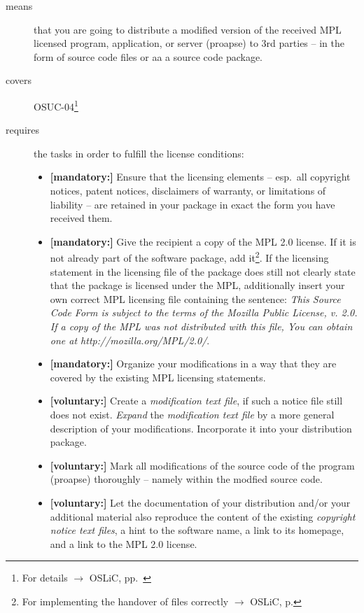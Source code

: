 \begin{description}
\item[means] that you are going to distribute a modified version of the received
MPL licensed program, application, or server (proapse) to 3rd parties -- in the
form of source code files or aa a source code package.
\item[covers] OSUC-04\footnote{For details $\rightarrow$ OSLiC, pp.\ \pageref{OSUC-04-DEF}}
\item[requires] the tasks in order to fulfill the license conditions:
\begin{itemize}
  
  \item \textbf{[mandatory:]} Ensure that the licensing elements -- esp.\ all
  copyright notices, patent notices, disclaimers of warranty, or limitations of
  liability -- are retained in your package in exact the form you have received
  them.

  \item \textbf{[mandatory:]} Give the recipient a copy of the MPL 2.0 license.
  If it is not already part of the software package, add it\footnote{For
  implementing the handover of files correctly $\rightarrow$ OSLiC, p.
  \pageref{DistributingFilesHint}}. If the licensing statement in the licensing
  file of the package does still not clearly state that the package is licensed
  under the MPL, additionally insert your own correct MPL licensing file
  containing the sentence: \emph{This Source Code Form is subject to the terms
  of the Mozilla Public License, v. 2.0. If a copy of the MPL was not
  distributed with this file, You can obtain one at
  http://mozilla.org/MPL/2.0/}.  
  
  \item \textbf{[mandatory:]} Organize your modifications in a way that they are
  covered by the existing MPL licensing statements.
  
  \item \textbf{[voluntary:]} Create a \emph{modification text file}, if such a
  notice file still does not exist. \emph{Expand} the \emph{modification text
  file} by a more general description of your modifications. Incorporate it into
  your distribution package.
  
  \item \textbf{[voluntary:]} Mark all modifications of the source code of the
  program (proapse) thoroughly -- namely within the modfied source code.

  \item \textbf{[voluntary:]} Let the documentation of your distribution and/or
  your additional material also reproduce the content of the existing
  \emph{copyright notice text files}, a hint to the software name, a link to its
  homepage, and a link to the MPL 2.0 license.
  

\end{itemize}
\end{description}
